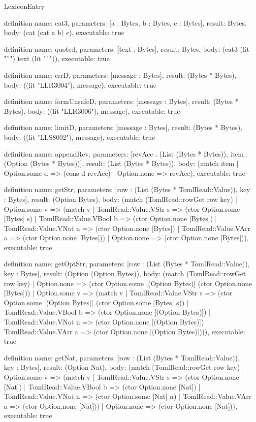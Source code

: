 \begin{lexlean}{LexiconEntry}
\begin{semanticmodule}
definition{
  name: cat3,
  parameters: [a : Bytes, b : Bytes, c : Bytes],
  result: Bytes,
  body: (cat (cat a b) c),
  executable: true
}

definition{
  name: quoted,
  parameters: [text : Bytes],
  result: Bytes,
  body: (cat3 (lit "`") text (lit "`")),
  executable: true
}

definition{
  name: errD,
  parameters: [message : Bytes],
  result: (Bytes * Bytes),
  body: ((lit "LLR3004"), message),
  executable: true
}

definition{
  name: formUnsafeD,
  parameters: [message : Bytes],
  result: (Bytes * Bytes),
  body: ((lit "LLR3006"), message),
  executable: true
}

definition{
  name: limitD,
  parameters: [message : Bytes],
  result: (Bytes * Bytes),
  body: ((lit "LLS8002"), message),
  executable: true
}

definition{
  name: appendRev,
  parameters: [revAcc : (List (Bytes * Bytes)), item : (Option (Bytes * Bytes))],
  result: (List (Bytes * Bytes)),
  body: (match item | Option.some d => (cons d revAcc) | Option.none => revAcc),
  executable: true
}

definition{
  name: getStr,
  parameters: [row : (List (Bytes * TomlRead::Value)), key : Bytes],
  result: (Option Bytes),
  body: (match (TomlRead::rowGet row key)
    | Option.some v => (match v
      | TomlRead::Value.VStr s => (ctor Option.some [Bytes] s)
      | TomlRead::Value.VBool b => (ctor Option.none [Bytes])
      | TomlRead::Value.VNat n => (ctor Option.none [Bytes])
      | TomlRead::Value.VArr a => (ctor Option.none [Bytes]))
    | Option.none => (ctor Option.none [Bytes])),
  executable: true
}

definition{
  name: getOptStr,
  parameters: [row : (List (Bytes * TomlRead::Value)), key : Bytes],
  result: (Option (Option Bytes)),
  body: (match (TomlRead::rowGet row key)
    | Option.none => (ctor Option.some [(Option Bytes)] (ctor Option.none [Bytes]))
    | Option.some v => (match v
      | TomlRead::Value.VStr s => (ctor Option.some [(Option Bytes)] (ctor Option.some [Bytes] s))
      | TomlRead::Value.VBool b => (ctor Option.none [(Option Bytes)])
      | TomlRead::Value.VNat n => (ctor Option.none [(Option Bytes)])
      | TomlRead::Value.VArr a => (ctor Option.none [(Option Bytes)]))),
  executable: true
}

definition{
  name: getNat,
  parameters: [row : (List (Bytes * TomlRead::Value)), key : Bytes],
  result: (Option Nat),
  body: (match (TomlRead::rowGet row key)
    | Option.some v => (match v
      | TomlRead::Value.VStr s => (ctor Option.none [Nat])
      | TomlRead::Value.VBool b => (ctor Option.none [Nat])
      | TomlRead::Value.VNat n => (ctor Option.some [Nat] n)
      | TomlRead::Value.VArr a => (ctor Option.none [Nat]))
    | Option.none => (ctor Option.none [Nat])),
  executable: true
}


\end{semanticmodule}
\end{lexlean}
